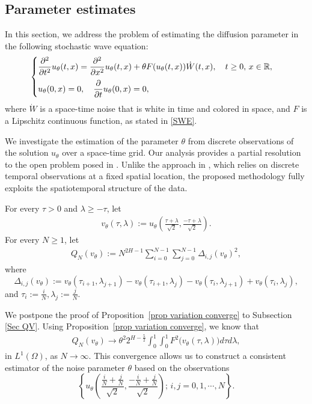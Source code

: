 \documentclass[11pt,reqno]{amsart}
\numberwithin{equation}{section}
\newcommand{\1}{{\bf 1}}
\newcommand{\2}{{\bf 2}}
\begin{document}
  \subsection{Parameter estimates}
In this section, we address the problem of estimating the diffusion parameter in the following stochastic wave equation:
    \begin{equation}\label{SWE para}
\begin{cases}
\vspace{6pt}
\displaystyle{\frac{\partial^2}{\partial t^2} u_{\theta }(t, x) =\frac{\partial^2}{\partial x^2} u_{\theta }(t, x) + \theta  F(u_{\theta}(t,x))\dot W(t, x), \quad t\ge 0, \, x \in \mathbb{R},}\\
\displaystyle{u_{\theta }(0, x) = 0, \quad \frac{\partial}{\partial t} u_{\theta}(0, x) = 0},
\end{cases}
\end{equation}
where $\dot W$ is a     space-time noise that is white in time and colored in space, and $F$ is a Lipschitz continuous function, as stated in \eqref{SWE}.

We investigate the estimation of the parameter $\theta$ from discrete observations of the solution $u_{\theta}$ over a space-time grid.
 Our analysis provides a partial resolution to the open problem posed in \cite[Remark 5.2]{AGT2022}. Unlike  the approach in \cite[Section 4]{TZ2025}, which relies on  discrete temporal  observations at a fixed spatial location,  the proposed methodology   fully exploits the   spatiotemporal structure of the data.
  
 
   
For every $\tau>0$ and $\lambda\ge -\tau$,    let
       \begin{align}\label{eq v theta}
   v_{\theta}(\tau, \lambda):=  u_{\theta}\left(\frac{\tau+\lambda}{\sqrt{2}}, \frac{-\tau+\lambda}{\sqrt{2}}\right). 
\end{align}
     For every $N\ge1$, let 
       \begin{align}\label{eq V v}
Q_{N}(v_{\theta}):= N^{2H-1}\sum_{i=0}^{N-1}\sum_{j=0}^{N-1}\Delta_{i,j}(v_{\theta})^2,
\end{align}
where 
$$
\Delta_{i,j}(v_{\theta})  := v_{\theta}\left(\tau_{i+1}, \lambda_{j+1}  \right)-v_{\theta}\left(\tau_{i+1}, \lambda_{j}\right)-v_{\theta}\left(\tau_{i}, \lambda_{j+1}  \right) +v_{\theta}\left(\tau_{i}, \lambda_{j}    \right), 
$$ 
 and    $\tau_i:=\frac{i}{N}, \lambda_j:=\frac{j}{N}$. 
 
  We postpone the proof of Proposition~\ref{prop variation converge}  to Subsection \ref{Sec QV}. Using Proposition~\ref{prop variation converge},  we know that
  \begin{align}\label{eq variation converge theta}
  Q_{N}(v_{\theta})\longrightarrow  \theta^2 2^{H-\frac{5}{2}}  \int_0^1\int_0^1 F^2\big(v_{\theta}(\tau, \lambda) \big) d\tau d\lambda,
  \end{align}
 in  $L^{1}(\Omega)$, as $N\rightarrow\infty$.  
This convergence allows us to  construct a consistent  estimator of the noise parameter $\theta$ based on the observations
$$\left\{u_{\theta}\left(\frac{\frac{i}{N}+\frac{j}{N} }{\sqrt 2}, \frac{-\frac{i}{N}+\frac{j}{N} }{\sqrt 2} \right);\, i, j = 0,1, \cdots, N\right\}.$$
  
\end{document}
